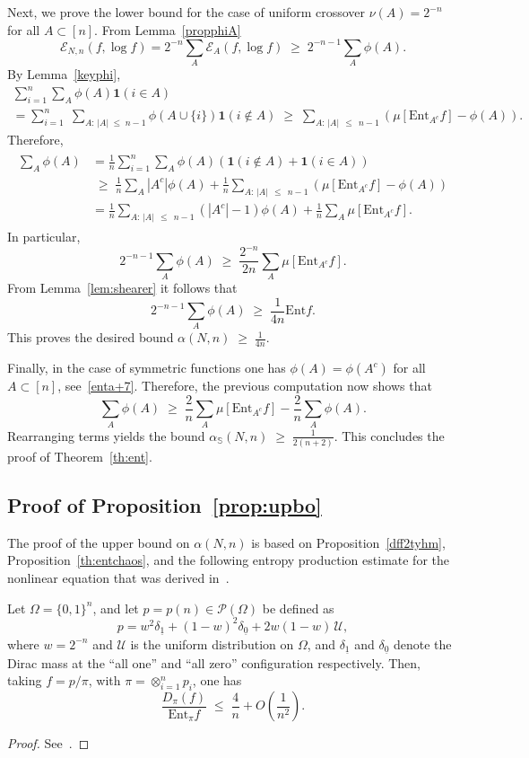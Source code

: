 \documentclass[AHL,Unicode,longabstracts,published]{cedram}
\renewcommand{\leq}{\;\leqslant\;}
\renewcommand{\geq}{\;\geqslant\;}
\newcommand{\ent}{\mathrm{Ent}}
\newcommand{\ind}{\mathbf{1}}
\newcommand{\cE}{\mathcal{E}}
\newcommand{\cP}{\mathcal{P}}
\newcommand{\cU}{\mathcal{U}}
\newcommand{\bbS}{\mathbb{S}}
\let\a=\alpha
\let\d=\delta
\let\O=\Omega
\begin{document}
Next, we prove the lower bound for the case of uniform crossover $\nu(A)=2^{-n}$ for all $A\subset[n]$. From Lemma~\ref{propphiA}
\[
\cE_{N,n}(f,\log f)=2^{-n}\sum_A \cE_A(f,\log f)\geq 2^{-n-1}\sum_A \phi(A).
\]
By Lemma~\ref{keyphi},
\begin{multline*}
\sum_{i=1}^n\sum_{A}\phi(A)\ind(i\in A)\\
= \sum_{i=1}^n\;\sum_{A: \,|A|\leq n-1}\phi(A\cup\{i\})\ind(i\notin A)
\geq \sum_{A: \,|A|\,\leq\,n-1} \left(\mu\left[\ent_{A^c}f \right] - \phi(A)\right).
\end{multline*}
Therefore,
\begin{align}\label{enta+43}
\begin{split}
\sum_A \phi(A)&= \frac1n\sum_{i=1}^n\sum_{A}\phi(A)(\ind(i\notin A) +\ind(i\in A))
\\&\geq \frac1n\sum_{A}|A^c|\phi(A) + \frac1n\sum_{A: \,|A|\,\leq\,n-1}\left(\mu\left[\ent_{A^c}f \right] - \phi(A)\right) \\
&=\frac1n\sum_{A:\, |A|\,\leq\,n-1}(|A^c|-1)\phi(A) + \frac1n\sum_{A}\mu\left[\ent_{A^c}f \right].
\end{split}
\end{align}
In particular,
\[
2^{-n-1}\sum_A \phi(A)\geq \frac{2^{-n}}{2n}\sum_A\mu\left[\ent_{A^c}f \right].
\]
From Lemma~\ref{lem:shearer} it follows that
\[
2^{-n-1}\sum_A \phi(A)\geq \frac{1}{4n}\ent f.
\]
This proves the desired bound $\a(N,n)\geq \frac{1}{4n}$.

Finally, in the case of symmetric functions one has $\phi(A)=\phi(A^c)$ for all $A\subset[n]$, see~\eqref{enta+7}. Therefore, the previous computation now shows that
\[
\sum_A \phi(A)\geq \frac2n\sum_{A}\mu\left[\ent_{A^c}f \right] - \frac2n \sum_A \phi(A).
\]
Rearranging terms yields the bound $\a_\bbS(N,n)\geq \frac{1}{2(n+2)}$. This concludes the proof of Theorem~\ref{th:ent}.



\subsection{Proof of Proposition~\ref{prop:upbo}}

The proof of the upper bound on $\a(N,n)$ is based on Proposition~\ref{dff2tyhm}, Proposition~\ref{th:entchaos}, and the following entropy production estimate for the nonlinear equation that was derived in~\cite{entprod}.

\begin{lemm}\label{lem:entprod}
Let $\O=\{0,1\}^n$, and let $p=p(n)\in \cP(\O)$ be defined as
\[
p = w^2\d_{\underline 1} + (1-w)^2\d_{\underline 0} + 2w(1-w) \,\cU,
\]
where $w=2^{-n}$ and $\cU$ is the uniform distribution on $\O$, and $\d_{\underline 1}$ and $\d_{\underline 0}$ denote the Dirac mass at the ``all one'' and ``all zero'' configuration respectively. Then, taking $f=p/\pi$, with $\pi=\otimes_{i=1}^np_i$, one has
\begin{equation}\label{edff2}
\frac{D_\pi(f)}{\ent_\pi f}\leq \frac{4}{n} + O\left(\frac1{n^{2}}\right).
\end{equation}
\end{lemm}
\begin{proof}
See~\cite[Proposition~4.7]{entprod}.
\end{proof}
\end{document}
